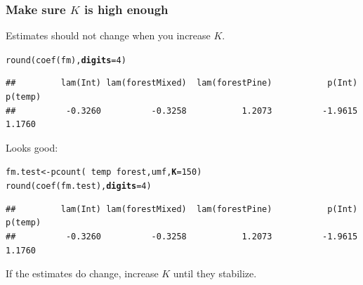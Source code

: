 \documentclass[color=usenames,dvipsnames]{beamer}\usepackage[]{graphicx}\usepackage[]{xcolor}
\makeatletter
\newcommand{\hlnum}[1]{\textcolor[rgb]{0.69,0.494,0}{#1}}%
\newcommand{\hlopt}[1]{\textcolor[rgb]{0,0,0}{#1}}%
\newcommand{\hldef}[1]{\textcolor[rgb]{0,0,0}{#1}}%
\newcommand{\hlkwb}[1]{\textcolor[rgb]{0,0.341,0.682}{#1}}%
\newcommand{\hlkwc}[1]{\textcolor[rgb]{0,0,0}{\textbf{#1}}}%
\newcommand{\hlkwd}[1]{\textcolor[rgb]{0.004,0.004,0.506}{#1}}%
\newenvironment{kframe}{%
 \def\at@end@of@kframe{}%
 \ifinner\ifhmode%
  \def\at@end@of@kframe{\end{minipage}}%
  \begin{minipage}{\columnwidth}%
 \fi\fi%
 \def\FrameCommand##1{\hskip\@totalleftmargin \hskip-\fboxsep
 \colorbox{shadecolor}{##1}\hskip-\fboxsep
     \hskip-\linewidth \hskip-\@totalleftmargin \hskip\columnwidth}%
 \MakeFramed {\advance\hsize-\width
   \@totalleftmargin\z@ \linewidth\hsize
   \@setminipage}}%
 {\par\unskip\endMakeFramed%
 \at@end@of@kframe}
\newenvironment{knitrout}{}{} %
\makeatother
\begin{document}
\begin{frame}[fragile]
  \frametitle{Make sure $K$ is high enough}

  Estimates should not change when you increase $K$.
  \vspace{-6pt}
\begin{knitrout}\tiny
{}\color{fgcolor}\begin{kframe}
\begin{alltt}
\hlkwd{round}\hldef{(}\hlkwd{coef}\hldef{(fm),} \hlkwc{digits}\hldef{=}\hlnum{4}\hldef{)}
\end{alltt}
\begin{verbatim}
##         lam(Int) lam(forestMixed)  lam(forestPine)           p(Int)          p(temp) 
##          -0.3260          -0.3258           1.2073          -1.9615           1.1760
\end{verbatim}
\end{kframe}
\end{knitrout}
\pause
\vfill
  Looks good:
  \vspace{-6pt}
\begin{knitrout}\tiny
{}\color{fgcolor}\begin{kframe}
\begin{alltt}
\hldef{fm.test} \hlkwb{<-} \hlkwd{pcount}\hldef{(}\hlopt{~}\hldef{temp} \hlopt{~}\hldef{forest, umf,} \hlkwc{K}\hldef{=}\hlnum{150}\hldef{)}
\hlkwd{round}\hldef{(}\hlkwd{coef}\hldef{(fm.test),} \hlkwc{digits}\hldef{=}\hlnum{4}\hldef{)}
\end{alltt}
\begin{verbatim}
##         lam(Int) lam(forestMixed)  lam(forestPine)           p(Int)          p(temp) 
##          -0.3260          -0.3258           1.2073          -1.9615           1.1760
\end{verbatim}
\end{kframe}
\end{knitrout}
\pause
\vfill
If the estimates do change, increase $K$ until they stabilize.
\end{frame}
\end{document}
